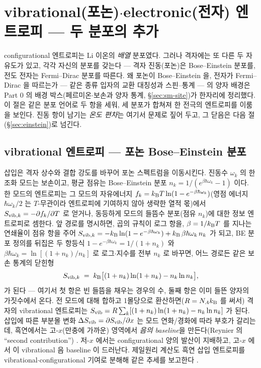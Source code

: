\section{vibrational(포논)$\cdot$electronic(전자) 엔트로피 --- 두 분포의 추가}\label{sec:vibel}

configurational 엔트로피는 Li 이온의 \emph{배열} 분포였다. 그러나 격자에는 또 다른 두 자유도가 있고, 각각
자신의 분포를 갖는다 --- 격자 진동(포논)은 Bose--Einstein 분포를, 전도 전자는 Fermi--Dirac 분포를 따른다.
왜 포논이 Bose--Einstein 을, 전자가 Fermi--Dirac 을 따르는가 --- 같은 종류 입자의 교환 대칭성과
스핀--통계 --- 의 양자 배경은 Part 0 의 배경 박스(페르미온$\cdot$보손과 양자 통계, \S\ref{sec:sm-site})가 한자리에 정리했다.
이 절은 같은 분포 언어로 두 항을 세워, 세 분포가 합쳐져 한 전극의 엔트로피를 이룸을 보인다. 진동 항이
남기는 \emph{온도 편차}는 여기서 문제로 짚어 두고, 그 닫음은 다음 절(\S\ref{sec:einstein})로 넘긴다.

\subsection{vibrational 엔트로피 --- 포논 Bose--Einstein 분포}\label{ssec:vib}
삽입은 격자 상수와 결합 강도를 바꾸어 포논 스펙트럼을 이동시킨다. 진동수 $\omega_k$ 의 한 조화 모드는
보손이고, 평균 점유는 Bose--Einstein 분포 $n_k=1/(e^{\beta\hbar\omega_k}-1)$ 이다. 한 모드의 엔트로피는 그
모드의 자유에너지 $f_k=k_{\mathrm B} T\ln(1-e^{-\beta\hbar\omega_k})$(영점 에너지 $\hbar\omega_k/2$ 는 $T$-무관이라
엔트로피에 기여하지 않아 생략한 열적 몫)에서 $S_{\mathrm{vib},k}=-\partial f_k/\partial T$ 로 얻거나,
동등하게 모드의 들뜸수 분포(점유 $n_k$)에 대한 정보 엔트로피로 셈한다. 앞 경로를 명시하면, 곱의 규칙이
로그 항을, $\beta=1/k_{\mathrm B} T$ 를 지나는 연쇄율이 점유 항을 주어
$S_{\mathrm{vib},k}=-k_{\mathrm B}\ln(1-e^{-\beta\hbar\omega_k})+k_{\mathrm B}\,\beta\hbar\omega_k\,n_k$ 가 되고, BE 분포 정의를 뒤집은 두
항등식 $1-e^{-\beta\hbar\omega_k}=1/(1+n_k)$ 와 $\beta\hbar\omega_k=\ln[(1+n_k)/n_k]$ 로 로그$\cdot$지수를 전부
$n_k$ 로 바꾸면, 어느 경로든 같은 보손 통계의 닫힌형
\begin{equation}
S_{\mathrm{vib},k} \;=\; k_{\mathrm B}\bigl[(1+n_k)\ln(1+n_k) - n_k\ln n_k\bigr],
\label{eq:Svib_mode}
\end{equation}
가 된다 --- 여기서 첫 항은 빈 들뜸을 채우는 경우의 수, 둘째 항은 이미 들뜬 양자의 가짓수에서 온다. 전
모드에 대해 합하고 1몰당으로 환산하면($R=N_Ak_{\mathrm B}$ 를 써서) 격자의 vibrational 엔트로피는
$S_{\mathrm{vib}}=R\sum_k[(1+n_k)\ln(1+n_k)-n_k\ln n_k]$ 가 된다. 삽입에 따른 부분몰 변화 $\Delta S_{\mathrm{vib}}=\partial
S_{\mathrm{vib}}/\partial x$ 는 모드 연화/경화에 따라 부호가 갈리는데, 흑연에서는 고-$x$(만충에 가까운) 영역에서
\emph{음의 baseline}을 만든다(Reynier 의 ``second contribution'') \cite{reynier2003}. 저-$x$ 에서는
configurational 양의 발산이 지배하고, 고-$x$ 에서 이 vibrational 음 baseline 이 드러난다. 제일원리 계산도
흑연 삽입 엔트로피를 vibrational$\cdot$configurational 기여로 분해해 같은 추세를 보고한다 \cite{jpcc2021}.

